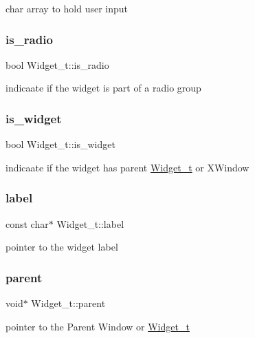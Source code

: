 char array to hold user input \mbox{\label{structWidget__t_acb0bba70f001420ed9a33128c10e74ed}} 
\subsubsection{\texorpdfstring{is\+\_\+radio}{is\_radio}}
{\footnotesize\ttfamily bool Widget\+\_\+t\+::is\+\_\+radio}

indicaate if the widget is part of a radio group \mbox{\label{structWidget__t_aff0b7ecbf87b995342d13e2efe79dfca}} 
\subsubsection{\texorpdfstring{is\+\_\+widget}{is\_widget}}
{\footnotesize\ttfamily bool Widget\+\_\+t\+::is\+\_\+widget}

indicaate if the widget has parent \hyperlink{structWidget__t}{Widget\+\_\+t} or X\+Window \mbox{\label{structWidget__t_a952020107ac1f6d9a37b4f978f77b61c}} 
\subsubsection{\texorpdfstring{label}{label}}
{\footnotesize\ttfamily const char$\ast$ Widget\+\_\+t\+::label}

pointer to the widget label \mbox{\label{structWidget__t_a483f6517c19fe09e1bf2eaec6646a14b}} 
\subsubsection{\texorpdfstring{parent}{parent}}
{\footnotesize\ttfamily void$\ast$ Widget\+\_\+t\+::parent}

pointer to the Parent Window or \hyperlink{structWidget__t}{Widget\+\_\+t} \mbox{\label{structWidget__t_ae2d46ffb30bb2335a043d138fa05e1a3}} 
